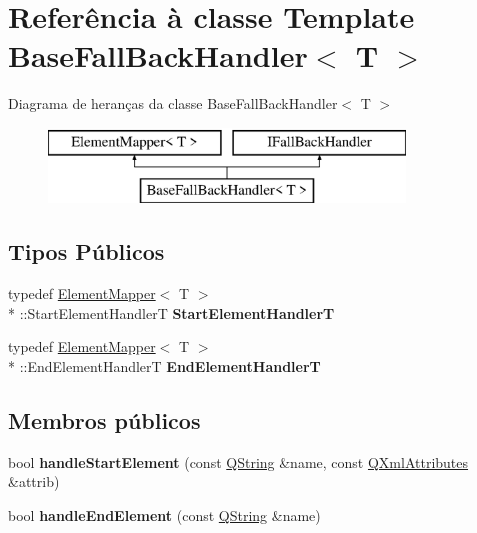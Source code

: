 \hypertarget{class_base_fall_back_handler}{\section{Referência à classe Template Base\-Fall\-Back\-Handler$<$ T $>$}
\label{class_base_fall_back_handler}
}
Diagrama de heranças da classe Base\-Fall\-Back\-Handler$<$ T $>$\begin{figure}[H]
\begin{center}
\leavevmode
\includegraphics[height=2.000000cm]{class_base_fall_back_handler}
\end{center}
\end{figure}
\subsection*{Tipos Públicos}
\begin{DoxyCompactItemize}
\item 
\hypertarget{class_base_fall_back_handler_a99d76adba2066eddf6a2a09161d74dbd}{typedef \hyperlink{class_element_mapper}{Element\-Mapper}$<$ T $>$\\*
\-::Start\-Element\-Handler\-T {\bfseries Start\-Element\-Handler\-T}}\label{class_base_fall_back_handler_a99d76adba2066eddf6a2a09161d74dbd}

\item 
\hypertarget{class_base_fall_back_handler_addda909666f4e847e7732b0a526d0796}{typedef \hyperlink{class_element_mapper}{Element\-Mapper}$<$ T $>$\\*
\-::End\-Element\-Handler\-T {\bfseries End\-Element\-Handler\-T}}\label{class_base_fall_back_handler_addda909666f4e847e7732b0a526d0796}

\end{DoxyCompactItemize}
\subsection*{Membros públicos}
\begin{DoxyCompactItemize}
\item 
\hypertarget{class_base_fall_back_handler_a23fe44db946c758ca185dce857d2da2c}{bool {\bfseries handle\-Start\-Element} (const \hyperlink{class_q_string}{Q\-String} \&name, const \hyperlink{class_q_xml_attributes}{Q\-Xml\-Attributes} \&attrib)}\label{class_base_fall_back_handler_a23fe44db946c758ca185dce857d2da2c}

\item 
\hypertarget{class_base_fall_back_handler_a12f464e8ce7306921c37c2b0101a9dd6}{bool {\bfseries handle\-End\-Element} (const \hyperlink{class_q_string}{Q\-String} \&name)}\label{class_base_fall_back_handler_a12f464e8ce7306921c37c2b0101a9dd6}

\end{DoxyCompactItemize}
